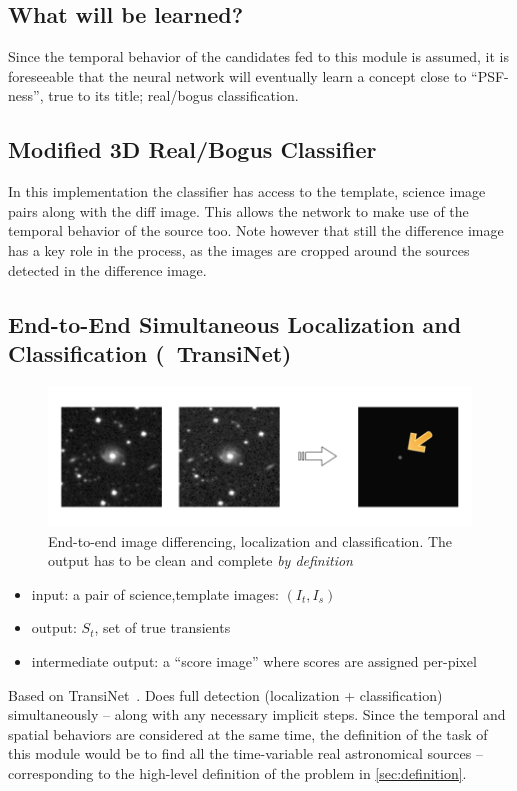 \subsection{What will be learned?}
Since the temporal behavior of the candidates fed to this module is assumed, it is foreseeable that the neural network will eventually learn a concept close to ``PSF-ness'', true to its title; real/bogus classification.

\subsection{Modified 3D Real/Bogus Classifier}
In this implementation the classifier has access to the template, science image pairs along with the diff image. This allows the network to make use of the temporal behavior of the source too.
Note however that still the difference image has a key role in the process, as the images are cropped around the sources detected in the difference image.

\subsection{End-to-End Simultaneous Localization and Classification (~TransiNet)}

\begin{figure}[h]
  \centering
  \includegraphics[width=.8\textwidth]{material/transinet-teaser}
  \caption{End-to-end image differencing, localization and classification. The output has to be clean and complete \emph{by definition} }
  \label{fig:transinet-teaser}
\end{figure}

\begin{itemize}
  \item input: a pair of science,template images: $(I_t,I_s)$
  \item output: $S_t$, set of true transients
  \item intermediate output: a ``score image'' where scores are assigned per-pixel
\end{itemize}

Based on TransiNet~\cite{transinet}. Does full detection (localization + classification) simultaneously -- along with any necessary implicit steps.
Since the temporal and spatial behaviors are considered at the same time, the definition of the task of this module would be to find all the time-variable real astronomical sources -- corresponding to the high-level definition of the problem in \ref{sec:definition}.





